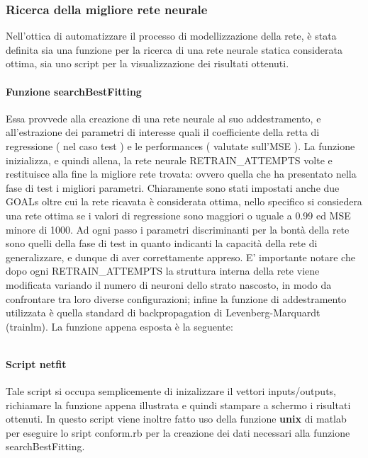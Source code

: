\subsubsection{Ricerca della migliore rete neurale}
Nell'ottica di automatizzare il processo di modellizzazione della rete, è stata definita sia una funzione per la ricerca di una rete neurale statica considerata ottima, sia uno script per la visualizzazione dei risultati ottenuti.

\paragraph{Funzione searchBestFitting}
Essa provvede alla creazione di una rete neurale al suo addestramento, e all'estrazione dei parametri di interesse quali il coefficiente della retta di regressione ( nel caso test ) e le performances ( valutate sull'MSE ).
La funzione inizializza, e quindi allena, la rete neurale RETRAIN\_ATTEMPTS volte e restituisce alla fine la migliore rete trovata: ovvero quella che ha presentato nella fase di test i migliori parametri.
Chiaramente sono stati impostati anche due GOALs oltre cui la rete ricavata è considerata ottima, nello specifico si consiedera una rete ottima se i valori di regressione sono maggiori o uguale a 0.99 ed MSE minore di 1000.
Ad ogni passo i parametri discriminanti per la bontà della rete sono quelli della fase di test in quanto indicanti la capacità della rete di generalizzare, e dunque di aver correttamente appreso.
E' importante notare che dopo ogni RETRAIN\_ATTEMPTS la struttura interna della rete viene modificata variando il numero di neuroni dello strato nascosto, in modo da confrontare tra loro diverse configurazioni; infine la funzione di addestramento utilizzata è quella standard di backpropagation di Levenberg-Marquardt (trainlm).
La funzione appena esposta è la seguente:

\inputminted[linenos=true,fontsize=\footnotesize]{matlab}{../../src/neural\ network/functions/searchBestFitting.m}


\paragraph{Script netfit}
Tale script si occupa semplicemente di inizalizzare il vettori inputs/outputs, richiamare la funzione appena illustrata e quindi stampare a schermo i risultati ottenuti.
In questo script viene inoltre fatto uso della funzione {\bf unix} di matlab per eseguire lo sript conform.rb per la creazione dei dati necessari alla funzione searchBestFitting.

